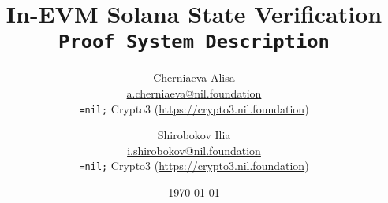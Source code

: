 \setlength{\droptitle}{-4\baselineskip} %

\pretitle{\begin{center}\Huge\bfseries} %
\title{In-EVM Solana State Verification \\ \texttt{Proof System Description}} %
\posttitle{\end{center}} %
\author{ %
	\protect\begin{tabular}{c} \normalsize Cherniaeva Alisa \\
	    \normalsize \href{mailto:a.cherniaeva@nil.foundation}{a.cherniaeva@nil.foundation} \\
	    \normalsize \texttt{=nil;} Crypto3 (\url{https://crypto3.nil.foundation})\\ 
	\protect\end{tabular}
	\and
	\protect\begin{tabular}{c} \normalsize Shirobokov Ilia \\
	    \normalsize \href{mailto:i.shirobokov@nil.foundation}{i.shirobokov@nil.foundation} \\
	    \normalsize \texttt{=nil;} Crypto3 (\url{https://crypto3.nil.foundation})\\ 
	\protect\end{tabular}
}
\date{\today} %
